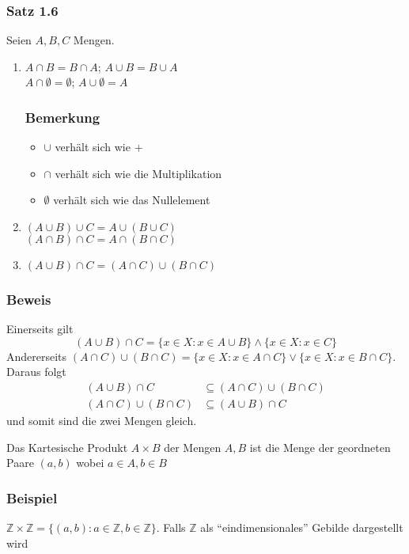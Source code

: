 \subsubsection*{Satz 1.6}
Seien $A,B,C$ Mengen. 
\begin{enumerate}
\item $A\cap B=B\cap A$; $A\cup B=B\cup A$\\
$A\cap \emptyset=\emptyset$; $A\cup \emptyset=A$\vspace{-4mm}
\subsubsection*{Bemerkung}
\begin{itemize}
    \item $\cup$ verhält sich wie $+$
    \item $\cap$ verhält sich wie die Multiplikation
    \item $\emptyset$ verhält sich wie das Nullelement
\end{itemize}
    \item $\left( A\cup B\right)\cup C=A\cup\left( B\cup C\right)$\\
    $\left( A\cap B\right)\cap C=A\cap\left( B\cap C\right)$
    \item $\left( A\cup B\right) \cap C=\left( A\cap C\right) \cup \left( B\cap C\right)$
\end{enumerate}



\subsubsection*{Beweis}
Einerseits gilt
\[
(A \cup B) \cap C = \{x \in X: x \in A \cup B \} \land \{ x \in X: x \in C\}
\]
Andererseits $(A \cap C) \cup ( B \cap C) = \{ x \in X: x \in A \cap C \} \lor \{ x \in X : x \in B \cap C \}$. Daraus folgt
\begin{align*}
(A \cup B ) \cap C &\subseteq (A \cap C) \cup (B \cap C) \\
(A \cap C ) \cup (B \cap C) &\subseteq (A \cup B) \cap C
\end{align*}
und somit sind die zwei Mengen gleich.

\begin{definition}{1.7}
Das Kartesische Produkt $A\times B$ der Mengen $A,B$ ist die Menge der geordneten Paare $(a,b)$ wobei $a\in A, b\in B$
\end{definition}

\subsubsection*{Beispiel}
$\mathbb{Z}\times\mathbb{Z}=\{(a,b):a\in\mathbb{Z},b\in\mathbb{Z}\}$. Falls $\mathbb{Z}$ als ``eindimensionales'' Gebilde dargestellt wird 

